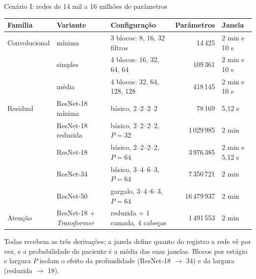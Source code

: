 \documentclass[10pt,aspectratio=169]{beamer}
\newcommand{\fonte}[1]{\par\vfill{\scriptsize\color{cinza}#1}}
\begin{document}
\begin{frame}{Cenário I: redes de 14 mil a 16 milhões de parâmetros}
  \centering
  \footnotesize
  \begin{tabular}{lllrl}
    \toprule
    Família & Variante & Configuração & Parâmetros & Janela \\
    \midrule
    Convolucional & mínima & 3 blocos: 8, 16, 32 filtros & 14\,425 & 2 min e 10 s \\
                  & simples & 4 blocos: 16, 32, 64, 64 & 109\,361 & 2 min e 10 s \\
                  & média & 4 blocos: 32, 64, 128, 128 & 418\,145 & 2 min e 10 s \\
    \midrule
    Residual & ResNet-18 mínima & básico, 2--2--2--2 & 78\,169 & 5,12 s \\
             & ResNet-18 reduzida & básico, 2--2--2--2, $P=32$ & 1\,029\,985 & 2 min \\
             & ResNet-18 & básico, 2--2--2--2, $P=64$ & 3\,976\,385 & 2 min e 5,12 s \\
             & ResNet-34 & básico, 3--4--6--3, $P=64$ & 7\,350\,721 & 2 min \\
             & ResNet-50 & gargalo, 3--4--6--3, $P=64$ & 16\,479\,937 & 2 min \\
    \midrule
    Atenção & ResNet-18 + \textit{Transformer} & reduzida + 1 camada, 4 cabeças & 1\,491\,553 & 2 min \\
    \bottomrule
  \end{tabular}
  \fonte{Todas recebem as três derivações; a janela define quanto do registro a rede vê por vez, e a probabilidade do paciente é a média das suas janelas. Blocos por estágio e largura $P$ isolam o efeito da profundidade (ResNet-18 $\to$ 34) e da largura (reduzida $\to$ 18).}
\end{frame}
\end{document}
